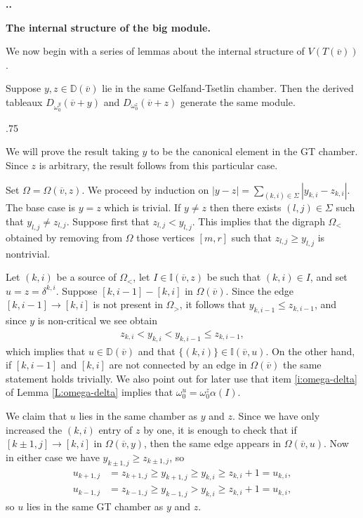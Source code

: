 \documentclass[11pt,fleqn]{amsart}
\makeatletter
\renewcommand\thesection{\arabic{section}}
\renewcommand\proofname{Proof}
\renewenvironment{proof}[1][\textit{\proofname}]{\par
 \pushQED{\qed}%
 \normalfont \topsep.75\paraskip\relax
 \trivlist
 \item[\hskip\labelsep
 \itshape
 #1\@addpunct{.}]\ignorespaces
}{%
 \popQED\endtrivlist\@endpefalse
}
\newcounter{para}[section]
\renewcommand\thepara{\thesection.\arabic{para}}
\def\paragraph{%
 \noindent
 \refstepcounter{para}%
 \textbf{\thepara.}\hspace{1ex}%
}
\newcommand\about[1]{%
 {\bfseries#1.}%
}
\newcommand\vv{\overline{v}}
\newcommand\II{\mathbb I}
\newcommand\DD{\mathbb D}
\makeatother
\begin{document}
\paragraph
\about{The internal structure of the big module}
We now begin with a series of lemmas about the internal structure of 
$V(T(\vv))$.
\begin{Lemma}
Suppose $y,z \in \DD(\vv)$ lie in the same Gelfand-Tsetlin chamber. Then the
derived tableaux $D_{\omega_0^y}(\vv + y)$ and $D_{\omega_0^{z}}(\vv + z)$
generate the same module.
\end{Lemma}
\begin{proof}
We will prove the result taking $y$ to be the canonical element in the GT 
chamber. Since $z$ is arbitrary, the result follows from this particular case.

Set $\Omega = \Omega(\vv,z)$.
We proceed by induction on $|y-z| = \sum_{(k,i) \in \Sigma} |y_{k,i} - 
z_{k,i}|$. The base case is $y = z$ which is trivial. If $y \neq z$ then there 
exists $(l,j) \in \Sigma$ such that $y_{l,j} \neq z_{l,j}$. Suppose first
that $z_{l,j} < y_{l,j}$. This implies that the digraph $\Omega_<$ obtained by 
removing from $\Omega$ those vertices $[m,r]$ such that $z_{l,j} \geq 
y_{l,j}$ is nontrivial. 

Let $(k,i)$ be a source of $\Omega_<$, let $I \in \II(\vv,z)$ be such that 
$(k,i) \in I$, and set $u = z = \delta^{k,i}$. Suppose $[k,i-1] - [k,i]$ in 
$\Omega(\vv)$. Since the edge $[k,i-1] \rightarrow [k,i]$ is not present in 
$\Omega_>$, it follows that $y_{k,i-1} \leq z_{k,i-1}$, and since $y$ is 
non-critical we see obtain
\begin{align*}
z_{k,i} < y_{k,i} < y_{k,i-1} \leq z_{k,i-1},
\end{align*}
which implies that $u \in \DD(\vv)$ and that $\{(k,i)\} \in \II(\vv, u)$. On 
the other hand, if $[k,i-1]$ and $[k,i]$ are not connected by an edge in 
$\Omega(\vv)$ the same statement holds trivially. We also point out for
later use that item \ref{i:omega-delta} of Lemma \ref{L:omega-delta} 
implies that $\omega_0^u = \omega_0^z \alpha(I)$.

We claim that $u$ lies in the same chamber as $y$ and $z$. Since we have only
increased the $(k,i)$ entry of $z$ by one, it is enough to check that if 
$[k \pm 1,j] \rightarrow [k,i]$ in $\Omega(\vv,y)$, then the same edge appears
in $\Omega(\vv,u)$. Now in either case we have $y_{k \pm 1, j} \geq 
z_{k \pm 1, j}$, so
\begin{align*}
u_{k+1,j} 
	&= z_{k+1,j} \geq y_{k+1,j} \geq y_{k,i} \geq z_{k,i} + 1 = u_{k,i}, \\ 
u_{k-1,j} &= z_{k-1,j} \geq y_{k-1,j} > y_{k,i} \geq z_{k,i} + 1 = u_{k,i},
\end{align*}
so $u$ lies in the same GT chamber as $y$ and $z$. 


\end{proof}
\end{document}

